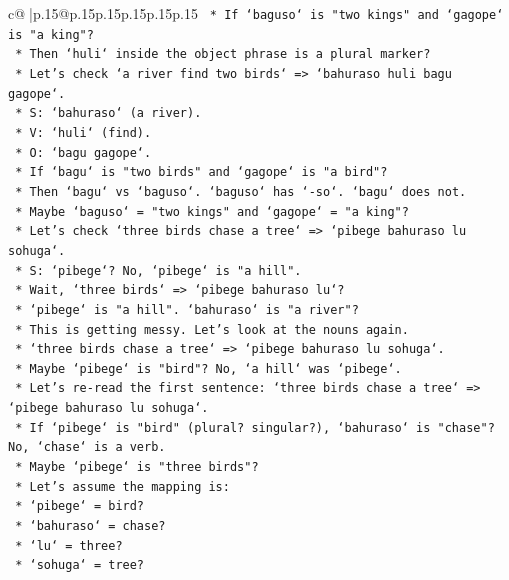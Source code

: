 \documentclass{article}
\begin{document}
{\begin{supertabular}{c@{$\;$}|p{.15\linewidth}@{}p{.15\linewidth}p{.15\linewidth}p{.15\linewidth}p{.15\linewidth}p{.15\linewidth}}
{{{\texttt{        *   If `baguso` is "two kings" and `gagope` is "a king"?} \\
\texttt{        *   Then `huli` inside the object phrase is a plural marker?} \\
\texttt{        *   Let's check `a river find two birds` => `bahuraso huli bagu gagope`.} \\
\texttt{        *   S: `bahuraso` (a river).} \\
\texttt{        *   V: `huli` (find).} \\
\texttt{        *   O: `bagu gagope`.} \\
\texttt{        *   If `bagu` is "two birds" and `gagope` is "a bird"?} \\
\texttt{        *   Then `bagu` vs `baguso`. `baguso` has `{-}so`. `bagu` does not.} \\
\texttt{        *   Maybe `baguso` = "two kings" and `gagope` = "a king"?} \\
\texttt{        *   Let's check `three birds chase a tree` => `pibege bahuraso lu sohuga`.} \\
\texttt{        *   S: `pibege`? No, `pibege` is "a hill".} \\
\texttt{        *   Wait, `three birds` => `pibege bahuraso lu`?} \\
\texttt{        *   `pibege` is "a hill". `bahuraso` is "a river"?} \\
\texttt{        *   This is getting messy. Let's look at the nouns again.} \\
\texttt{        *   `three birds chase a tree` => `pibege bahuraso lu sohuga`.} \\
\texttt{        *   Maybe `pibege` is "bird"? No, `a hill` was `pibege`.} \\
\texttt{        *   Let's re{-}read the first sentence: `three birds chase a tree` => `pibege bahuraso lu sohuga`.} \\
\texttt{        *   If `pibege` is "bird" (plural? singular?), `bahuraso` is "chase"? No, `chase` is a verb.} \\
\texttt{        *   Maybe `pibege` is "three birds"?} \\
\texttt{        *   Let's assume the mapping is:} \\
\texttt{            *   `pibege` = bird?} \\
\texttt{            *   `bahuraso` = chase?} \\
\texttt{            *   `lu` = three?} \\
\texttt{            *   `sohuga` = tree?} \\
}}}
\end{supertabular}}
\end{document}
